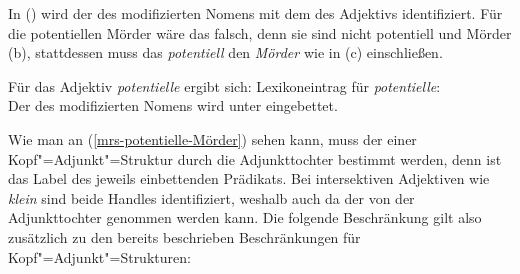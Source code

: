 In () wird der \ltopw des modifizierten Nomens mit dem \ltopw des Adjektivs
identifiziert. Für die potentiellen Mörder wäre das falsch, denn sie sind nicht potentiell und
Mörder (b), stattdessen muss das \emph{potentiell} den \emph{Mörder} wie in (c) einschließen.
\eal
\ex {}
\ex {}
\ex\label{mrs-potentielle-Mörder}
\zl

\noindent
Für das Adjektiv \emph{potentielle} ergibt sich:
\eas
Lexikoneintrag für \emph{potentielle}:\\
\zs
Der \ltopw des modifizierten Nomens  wird unter  eingebettet. 

Wie man an (\ref{mrs-potentielle-Mörder}) sehen kann, muss der \ltopw einer Kopf"=Adjunkt"=Struktur
durch die Adjunkttochter bestimmt werden, denn \ltop ist das Label des jeweils einbettenden
Prädikats. Bei intersektiven Adjektiven wie \emph{klein} sind beide Handles identifiziert, weshalb
auch da der \ltopw von der Adjunkttochter genommen werden kann. Die folgende Beschränkung gilt also
zusätzlich zu den bereits beschrieben Beschränkungen für Kopf"=Adjunkt"=Strukturen:
\ea
\label{Beschränkung-Semantik-Kopf-Adjunkt-Strukturen}
 \impl
\z

